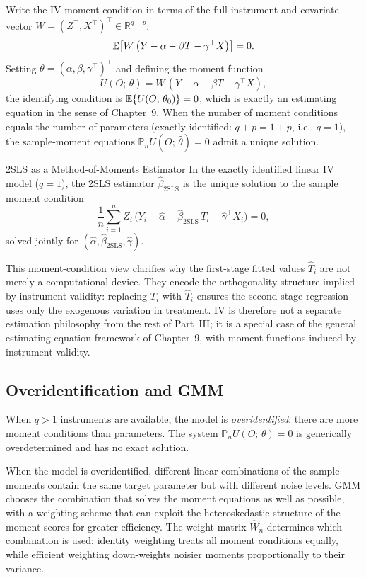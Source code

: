 \documentclass[master.tex]{subfiles}
\begin{document}
Write the IV moment condition in terms of the full instrument and
covariate vector $W = (Z^\top, X^\top)^\top \in \mathbb{R}^{q+p}$:
\[
  \mathbb{E}\bigl[W\,\bigl(Y - \alpha - \beta T - \gamma^\top X\bigr)\bigr] = 0.
\]
Setting $\theta = (\alpha, \beta, \gamma^\top)^\top$ and defining the
moment function
\[
  U(O;\,\theta) = W\,(Y - \alpha - \beta T - \gamma^\top X),
\]
the identifying condition is $\mathbb{E}\{U(O;\,\theta_0)\} = 0$, which is
exactly an estimating equation in the sense of Chapter~9.  When the
number of moment conditions equals the number of parameters (exactly
identified: $q + p = 1 + p$, i.e., $q = 1$), the sample-moment
equations $\mathbb{P}_n U(O;\,\hat\theta) = 0$ admit a unique solution.

\begin{thm}{2SLS as a Method-of-Moments Estimator}
\label{w12:thm:mm}
In the exactly identified linear IV model ($q = 1$), the 2SLS estimator
$\hat\beta_{\mathrm{2SLS}}$ is the unique solution to the sample
moment condition
\[
  \frac{1}{n}\sum_{i=1}^n
  Z_i\,\bigl(Y_i - \hat\alpha - \hat\beta_{\mathrm{2SLS}}\,T_i
             - \hat\gamma^\top X_i\bigr)
  = 0,
\]
solved jointly for $(\hat\alpha, \hat\beta_{\mathrm{2SLS}}, \hat\gamma)$.
\end{thm}

This moment-condition view clarifies why the first-stage fitted values
$\hat{T}_i$ are not merely a computational device.  They encode the
orthogonality structure implied by instrument validity: replacing $T_i$
with $\hat{T}_i$ ensures the second-stage regression uses only the
exogenous variation in treatment.  IV is therefore not a separate
estimation philosophy from the rest of Part~III; it is a special case
of the general estimating-equation framework of Chapter~9, with moment
functions induced by instrument validity.

\subsection{Overidentification and GMM}

When $q > 1$ instruments are available, the model is
\emph{overidentified}: there are more moment conditions than
parameters.  The system $\mathbb{P}_n U(O;\,\theta) = 0$ is
generically overdetermined and has no exact solution.

When the model is overidentified, different linear combinations of
the sample moments contain the same target parameter but with
different noise levels.  GMM chooses the combination that solves
the moment equations as well as possible, with a weighting scheme
that can exploit the heteroskedastic structure of the moment scores
for greater efficiency.  The weight matrix $\hat{W}_n$ determines
which combination is used: identity weighting treats all moment
conditions equally, while efficient weighting down-weights noisier
moments proportionally to their variance.
\end{document}
